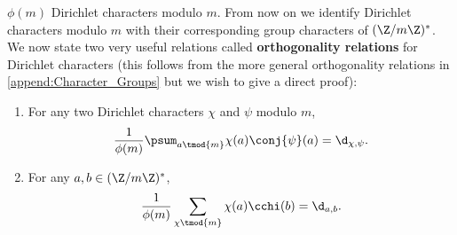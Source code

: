 $\phi(m)$ Dirichlet characters modulo $m$. From now on we identify Dirichlet characters modulo $m$ with their corresponding group characters of $(\Z/m\Z)^{\ast}$. We now state two very useful relations called \textbf{orthogonality relations} for Dirichlet characters (this follows from the more general orthogonality relations in \cref{append:Character_Groups} but we wish to give a direct proof):

      \begin{proposition}\label{prop:Dirichlet_orthogonality_relations}
      \phantom{ }
        \begin{enumerate}[label=(\roman*)]
          \item For any two Dirichlet characters $\chi$ and $\psi$ modulo $m$,
          \[
            \frac{1}{\phi(m)}\psum_{a \tmod{m}}\chi(a)\conj{\psi}(a) = \d_{\chi,\psi}.
          \]
          \item For any $a,b \in (\Z/m\Z)^{\ast}$,
          \[
            \frac{1}{\phi(m)}\sum_{\chi \tmod{m}}\chi(a)\cchi(b) = \d_{a,b}.
          \]
        \end{enumerate}
      \end{proposition}
